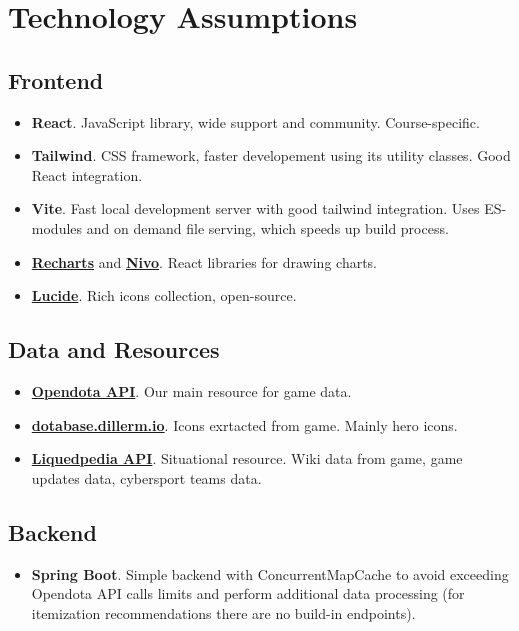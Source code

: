 \section{Technology Assumptions}

 \subsection{Frontend}
\begin{itemize}

    \item \textbf{React}. JavaScript library, wide support and community. Course-specific.
    \item \textbf{Tailwind}. CSS framework, faster developement using its utility classes. Good React integration.
    \item \textbf{Vite}. Fast local development server with good tailwind integration.
    Uses ES-modules and on demand file serving, which speeds up build process.

    \item \textbf{\href{https://recharts.org}{Recharts}} and \textbf{\href{https://nivo.rocks/}{Nivo}}. React libraries for drawing charts.
    \item \textbf{\href{https://lucide.dev/}{Lucide}}. Rich icons collection, open-source.

\end{itemize}

\subsection{Data and Resources}

\begin{itemize}

    \item \textbf{\href{https://docs.opendota.com/}{Opendota API}}. Our main resource for game data.
    \item \textbf{\href{https://dotabase.dillerm.io/}{dotabase.dillerm.io}}. Icons exrtacted from game. Mainly hero icons.
    \item \textbf{\href{https://liquipedia.net/dota2/Main_Page}{Liquedpedia API}}. Situational resource. Wiki data from game, game updates data, cybersport teams data.

\end{itemize}

\subsection{Backend}

\begin{itemize}

    \item \textbf{Spring Boot}. Simple backend with ConcurrentMapCache to avoid exceeding Opendota API calls limits and
    perform additional data processing (for itemization recommendations there are no build-in endpoints).

\end{itemize}